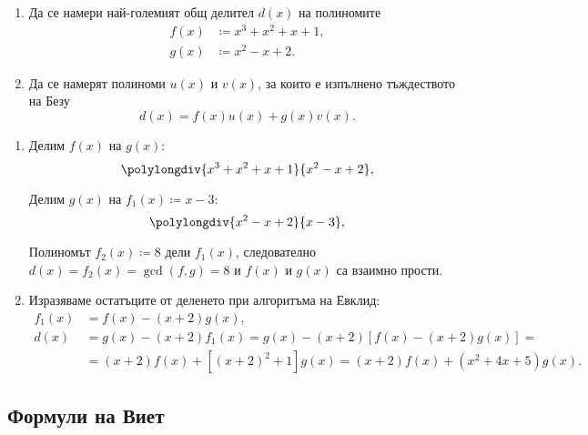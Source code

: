 \documentclass[numbers=endperiod, DIV=15, bibliography=totocnumbered]{scrartcl}
\begin{document}
\begin{exercise}
  \mbox{}
  \begin{enumerate}
    \item Да се намери най-големият общ делител $d(x)$ на полиномите
    \begin{align*}
      f(x) &\coloneqq x^3 + x^2 + x + 1, \\
      g(x) &\coloneqq x^2 - x + 2.
    \end{align*}

    \item Да се намерят полиноми $u(x)$ и $v(x)$, за които е изпълнено тъждеството на Безу
    \begin{displaymath}
      d(x) = f(x) u(x) + g(x) v(x).
    \end{displaymath}
  \end{enumerate}
\end{exercise}
\begin{solution}
  \mbox{}
  \begin{enumerate}
    \item Делим $f(x)$ на $g(x)$:
    \begin{displaymath}
      \polylongdiv {x^3 + x^2 + x + 1} {x^2 - x + 2},
    \end{displaymath}

    Делим $g(x)$ на $f_1(x) \coloneqq x - 3$:
    \begin{displaymath}
      \polylongdiv {x^2 - x + 2} {x - 3},
    \end{displaymath}

    Полиномът $f_2(x) \coloneqq 8$ дели $f_1(x)$, следователно $d(x) = f_2(x) = \gcd(f, g) = 8$ и $f(x)$ и $g(x)$ са взаимно прости.

    \item Изразяваме остатъците от деленето при алгоритъма на Евклид:
    \begin{align*}
      f_1(x)
      &=
      f(x) - (x + 2) g(x),
      \\
      d(x)
      &=
      g(x) - (x + 2) f_1(x)
      =
      g(x) - (x + 2) [f(x) - (x + 2) g(x)]
      = \\ &=
      (x + 2) f(x) + [{(x + 2)}^2 + 1] g(x)
      =
      \boxed{(x + 2) f(x) + (x^2 + 4x + 5) g(x)}.
    \end{align*}
  \end{enumerate}
\end{solution}

\subsection{Формули на Виет}
\end{document}
